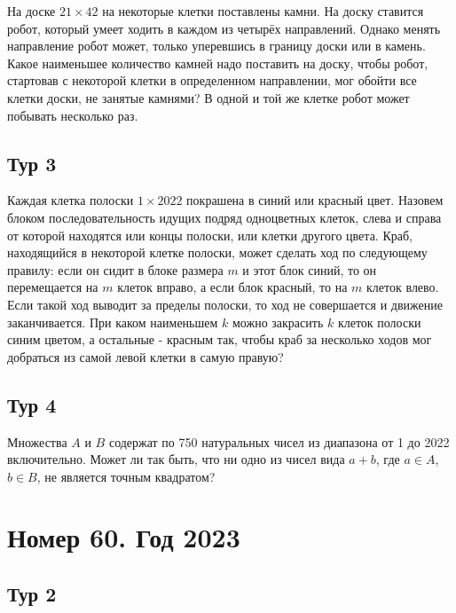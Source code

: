 \documentclass[11pt, a4paper]{problems_template}
\begin{document}
\begin{exercise}
На доске $21 \times 42$ на некоторые клетки поставлены камни. На доску ставится робот, который умеет ходить в каждом из четырёх направлений. Однако менять направление робот может, только уперевшись в границу доски или в камень. Какое наименьшее количество камней надо поставить на доску, чтобы робот, стартовав с некоторой клетки в определенном направлении, мог обойти все клетки доски, не занятые камнями? В одной и той же клетке робот может побывать несколько раз.
\end{exercise}

\section{Тур 3}

\begin{exercise}
Каждая клетка полоски $1 \times 2022$ покрашена в синий или красный цвет. Назовем блоком последовательность идущих подряд одноцветных клеток, слева и справа от которой находятся или концы полоски, или клетки другого цвета. Краб, находящийся в некоторой клетке полоски, может сделать ход по следующему правилу: если он сидит в блоке размера $m$ и этот блок синий, то он перемещается на $m$ клеток вправо, а если блок красный, то на $m$ клеток влево. Если такой ход выводит за пределы полоски, то ход не совершается и движение заканчивается. При каком наименьшем $k$ можно закрасить $k$ клеток полоски синим цветом, а остальные - красным так, чтобы краб за несколько ходов мог добраться из самой левой клетки
в самую правую?
\end{exercise}


\section{Тур 4}

\begin{exercise}
Множества $A$ и $B$ содержат по 750 натуральных чисел из диапазона от 1 до 2022 включительно. Может ли так быть, что ни одно из чисел вида $a + b$, где $a \in A$, $b \in B$, не является точным квадратом? 
\end{exercise}


\chapter{Номер 60. Год 2023}

\section{Тур 2}
\end{document}

